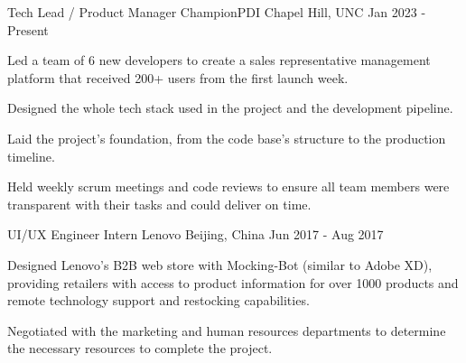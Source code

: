 \begin{cventries}
    \cventry
    {Tech Lead / Product Manager} %
    {ChampionPDI} %
    {Chapel Hill, UNC} %
    {Jan 2023 - Present} %
    {
      \begin{cvitems} %
        \item {Led a team of 6 new developers to create a sales representative management platform that received 200+ users from the first launch week.}
        \item {Designed the whole tech stack used in the project and the development pipeline.}
        \item {Laid the project's foundation, from the code base's structure to the production timeline.}
        \item {Held weekly scrum meetings and code reviews to ensure all team members were transparent with their tasks and could deliver on time.}
      \end{cvitems}
    }

    \cventry
    {UI/UX Engineer Intern} %
    {Lenovo} %
    {Beijing, China} %
    {Jun 2017 - Aug 2017} %
    {
      \begin{cvitems} %
        \item {Designed Lenovo's B2B web store with Mocking-Bot (similar to Adobe XD), providing retailers with access to product information for over 1000 products and remote technology support and restocking capabilities.}
        \item {Negotiated with the marketing and human resources departments to determine the necessary resources to complete the project.}
      \end{cvitems}
    }
    
    

\end{cventries}
